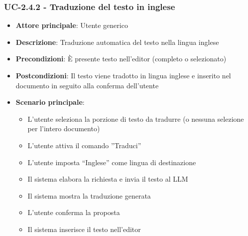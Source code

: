 \documentclass[11pt,a4paper]{article}
\begin{document}
\subsubsection{UC-2.4.2 - Traduzione del testo in inglese}
\begin{itemize}
    \item \textbf{Attore principale}: Utente generico
    \item \textbf{Descrizione}: Traduzione automatica del testo nella lingua inglese
    \item \textbf{Precondizioni}: È presente testo nell’editor (completo o selezionato)
    \item \textbf{Postcondizioni}: Il testo viene tradotto in lingua inglese e inserito nel documento in seguito alla conferma dell'utente
    \item \textbf{Scenario principale}:
    \begin{itemize}
        \item L’utente seleziona la porzione di testo da tradurre (o nessuna selezione per l'intero documento)
        \item L’utente attiva il comando ”Traduci”
        \item L’utente imposta “Inglese” come lingua di destinazione
        \item Il sistema elabora la richiesta e invia il testo al LLM
        \item Il sistema mostra la traduzione generata
        \item L'utente conferma la proposta
        \item Il sistema inserisce il testo nell'editor
    \end{itemize}
\end{itemize}
\end{document}

